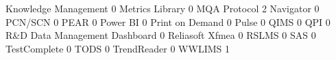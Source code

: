 \documentclass{article}
\begin{document}
\begin{Schunk}
\begin{Soutput}
  Knowledge Management                                                                 0
  Metrics Library                                                                      0
  MQA Protocol                                                                         2
  Navigator                                                                            0
  PCN/SCN                                                                              0
  PEAR                                                                                 0
  Power BI                                                                             0
  Print on Demand                                                                      0
  Pulse                                                                                0
  QIMS                                                                                 0
  QPI                                                                                  0
  R&D Data Management Dashboard                                                        0
  Reliasoft Xfmea                                                                      0
  RSLMS                                                                                0
  SAS                                                                                  0
  TestComplete                                                                         0
  TODS                                                                                 0
  TrendReader                                                                          0
  WWLIMS                                                                               1
                                                           

\end{Soutput}
\end{Schunk}
\end{document}
